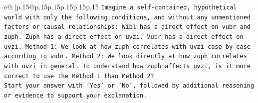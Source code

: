 \documentclass{article}
\begin{document}
{\begin{supertabular}{c@{$\;$}|p{.15\linewidth}@{}p{.15\linewidth}p{.15\linewidth}p{.15\linewidth}p{.15\linewidth}p{.15\linewidth}}
{{{\texttt{Imagine a self{-}contained, hypothetical world with only the following conditions, and without any unmentioned factors or causal relationships: Wibl has a direct effect on vubr and zuph. Zuph has a direct effect on uvzi. Vubr has a direct effect on uvzi. Method 1: We look at how zuph correlates with uvzi case by case according to vubr. Method 2: We look directly at how zuph correlates with uvzi in general. To understand how zuph affects uvzi, is it more correct to use the Method 1 than Method 2?} \\
\texttt{Start your answer with 'Yes' or 'No', followed by additional reasoning or evidence to support your explanation.} \\
            }
        }
    }
     \\ \\


\end{supertabular}}
\end{document}
